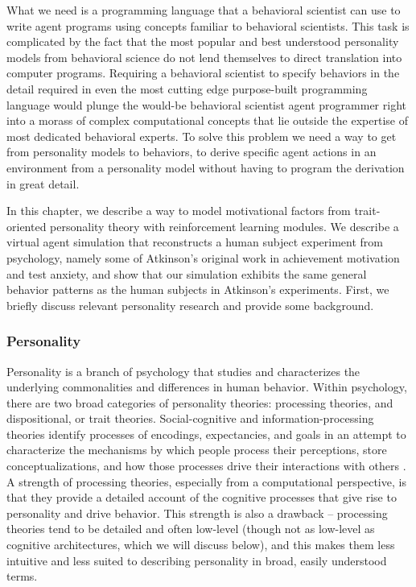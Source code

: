 What we need is a programming language that a behavioral scientist can use to write agent programs using concepts familiar to behavioral scientists.  This task is complicated by the fact that the most popular and best understood personality models from behavioral science do not lend themselves to direct translation into computer programs.  Requiring a behavioral scientist to specify behaviors in the detail required in even the most cutting edge purpose-built programming language would plunge the would-be behavioral scientist agent programmer right into a morass of complex computational concepts that lie outside the expertise of most dedicated behavioral experts. To solve this problem we need a way to get from personality models to behaviors, to derive specific agent actions in an environment from a personality model without having to program the derivation in great detail.

In this chapter, we describe a way to model motivational factors from trait-oriented personality theory with reinforcement learning modules.  We describe a virtual agent simulation that reconstructs a human subject experiment from psychology, namely some of Atkinson's original work in achievement motivation and test anxiety, and show that our simulation exhibits the same general behavior patterns as the human subjects in Atkinson's experiments.  First, we briefly discuss relevant personality research and provide some background.

\subsubsection{Personality}

Personality is a branch of psychology that studies and characterizes the underlying commonalities and differences in human behavior. Within psychology, there are two broad categories of personality theories: processing theories, and dispositional, or trait theories. Social-cognitive and information-processing theories identify processes of encodings, expectancies, and goals in an attempt to characterize the mechanisms by which people process their perceptions, store conceptualizations, and how those processes drive their interactions with others \cite{dweck1988a-social-cognitive,cervone2009personality,cervone1999the-coherence}. A strength of processing theories, especially from a computational perspective, is that they provide a detailed account of the cognitive processes that give rise to personality and drive behavior.  This strength is also a drawback -- processing theories tend to be detailed and often low-level (though not as low-level as cognitive architectures, which we will discuss below), and this makes them less intuitive and less suited to describing personality in broad, easily understood terms.

